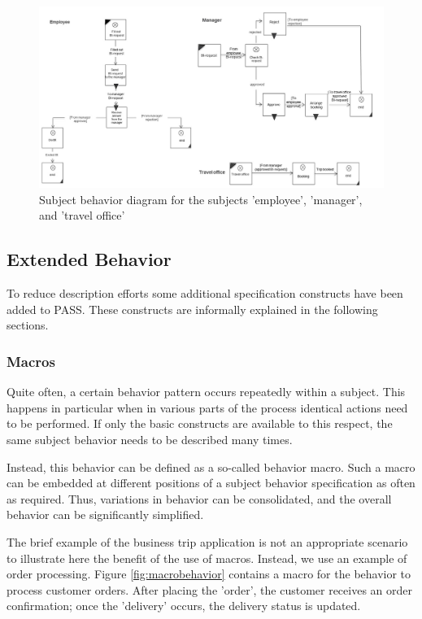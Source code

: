 \begin{landscape}
	\begin{figure}[htbp]
		\centering
		\includegraphics[width=0.9\linewidth]{Figures/Ontology/SubjectExecution/Vollst-Beispiel}
		\caption[Subject behavior diagram for the subjects 'employee', 'manager', and 'travel office']{Subject behavior diagram for the subjects 'employee', 'manager', and 'travel office'}
		\label{fig:vollst-beispiel}
	\end{figure}
\end{landscape}

\subsection{Extended Behavior}

To reduce description efforts some additional specification constructs have been added to PASS. These constructs are informally explained in the following sections. 

\subsubsection{Macros}

Quite often, a certain behavior pattern occurs repeatedly within a subject. This happens in particular when in various parts of the process identical actions need to be performed. If only the basic constructs are available to this respect, the same subject behavior needs to be described many times.

Instead, this behavior can be defined as a so-called behavior macro. Such a macro can be embedded at different positions of a subject behavior specification as often as required. Thus, variations in behavior can be consolidated, and the overall behavior can be significantly simplified.

The brief example of the business trip application is not an appropriate scenario to illustrate here the benefit of the use of macros. Instead, we use an example of order processing. Figure \ref{fig:macrobehavior} contains a macro for the behavior to process customer orders. After placing the 'order', the customer receives an order confirmation; once the 'delivery' occurs, the delivery status is updated.

